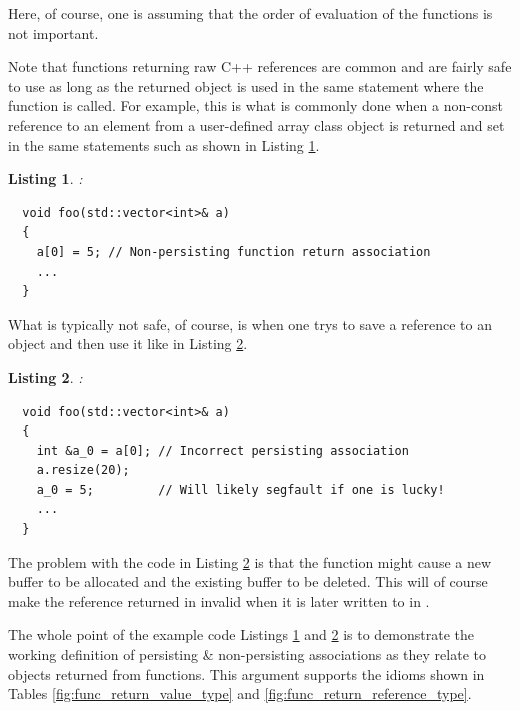 \documentclass[pdf,ps2pdf,11pt]{SANDreport}
\newtheorem{listing}{Listing}
\begin{document}
Here, of course, one is assuming that the order of evaluation of the
functions is not important.

Note that functions returning raw C++ references are common and are
fairly safe to use as long as the returned object is used in the same
statement where the function is called.  For example, this is what is
commonly done when a non-const reference to an element from a
user-defined array class object is returned and set in the same
statements such as shown in Listing
{}\ref{listing:non-persisting-array-return-1}.


\begin{listing}:\\
\label{listing:non-persisting-array-return-1}
{\small\begin{verbatim}
  void foo(std::vector<int>& a)
  {
    a[0] = 5; // Non-persisting function return association
    ...
  }
\end{verbatim}}
\end{listing}


What is typically not safe, of course, is when one trys to save a
reference to an object and then use it like in Listing
{}\ref{listing:bad-persisting-array-return-1}.


\begin{listing}:\\
\label{listing:bad-persisting-array-return-1}
{\small\begin{verbatim}
  void foo(std::vector<int>& a)
  {
    int &a_0 = a[0]; // Incorrect persisting association
    a.resize(20);
    a_0 = 5;         // Will likely segfault if one is lucky!
    ...
  }
\end{verbatim}}
\end{listing}


The problem with the code in Listing
{}\ref{listing:bad-persisting-array-return-1} is that the
{} function might cause a new buffer to be
allocated and the existing buffer to be deleted.  This will of course
make the reference returned in {} invalid
when it is later written to in {}.

The whole point of the example code Listings
{}\ref{listing:non-persisting-array-return-1} and
{}\ref{listing:bad-persisting-array-return-1} is to demonstrate the
working definition of persisting \& non-persisting associations as
they relate to objects returned from functions.  This argument
supports the idioms shown in Tables {}\ref{fig:func_return_value_type}
and {}\ref{fig:func_return_reference_type}.
\end{document}
